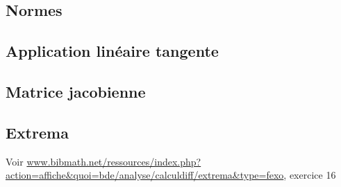 \newcommand{\multivar}{/home/robin/ENSEIGN/Cours/MathBiologie/L3-ENS-Math1/Exercices/MultiVar}

\subsection{Normes}





\subsection{Application linéaire tangente}





\subsection{Matrice jacobienne}





\subsection{Extrema}







Voir \url{www.bibmath.net/ressources/index.php?action=affiche&quoi=bde/analyse/calculdiff/extrema&type=fexo}, exercice 16




